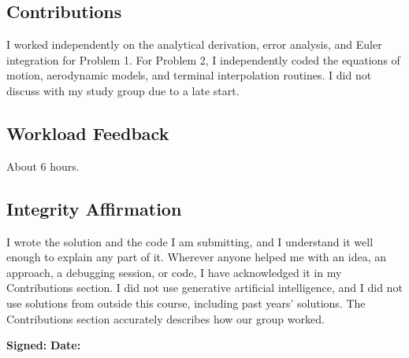 \documentclass[12pt]{article}
\numberwithin{equation}{subsection}
\begin{document}
\subsection*{Contributions}
I worked independently on the analytical derivation, error analysis, and Euler integration for Problem 1. For Problem 2, I independently coded the equations of motion, aerodynamic models, and terminal interpolation routines. I did not discuss with my study group due to a late start.

\subsection*{Workload Feedback}
About 6 hours.

\subsection*{Integrity Affirmation}
I wrote the solution and the code I am submitting, and I understand it well enough to explain any part of it. Wherever anyone helped me with an idea, an approach, a debugging session, or code, I have acknowledged it in my Contributions section. I did not use generative artificial intelligence, and I did not use solutions from outside this course, including past years' solutions. The Contributions section accurately describes how our group worked.
\vspace{0.5em}

\noindent\textbf{Signed:} \underline{} \quad \textbf{Date:} \underline{}
\end{document}
